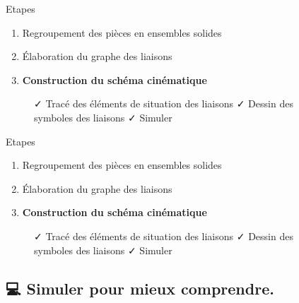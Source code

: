 \documentclass[
  ignorenonframetext,
  aspectratio=169,
  c]{beamer}
\providecommand{\tightlist}{%
  \setlength{\itemsep}{0pt}\setlength{\parskip}{0pt}}\usepackage{longtable,booktabs,array}
\begin{document}
\begin{frame}{Etapes}
\label{etapes-13}
\begin{enumerate}
\tightlist
\item
  {Regroupement des pièces en ensembles solides}
\item
  {Élaboration du graphe des liaisons}
\item
  \textbf{Construction du schéma cinématique}
\end{enumerate}

\begin{figure}

\begin{minipage}{0.80\linewidth}
✓ Tracé des éléments de situation des liaisons ✓ Dessin des symboles des
liaisons {✓ Simuler}\end{minipage}%

\end{figure}%
\end{frame}

\begin{frame}{Etapes}
\label{etapes-14}
\begin{enumerate}
\tightlist
\item
  {Regroupement des pièces en ensembles solides}
\item
  {Élaboration du graphe des liaisons}
\item
  \textbf{Construction du schéma cinématique}
\end{enumerate}

\begin{figure}

\begin{minipage}{0.80\linewidth}
{✓ Tracé des éléments de situation des liaisons} {✓ Dessin des symboles
des liaisons} ✓ Simuler\end{minipage}%

\end{figure}%
\end{frame}

\subsection{💻 Simuler pour mieux
comprendre.}\label{simuler-pour-mieux-comprendre.-1}
\end{document}
